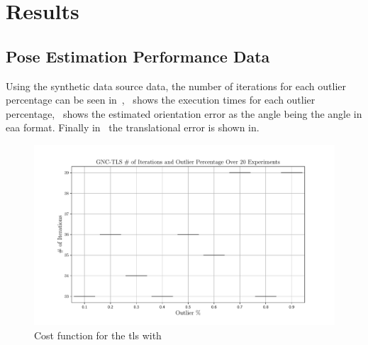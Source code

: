 \section{Results}\label{sec:2-pose-estimation-results}

\subsection{Pose Estimation Performance Data}

Using the synthetic data source data, the number of iterations for each outlier percentage can be seen in~,~ shows the execution times for each outlier percentage,~ shows the estimated orientation error as the angle  being the angle in \gls{eaa} format. Finally in~ the translational error is shown in. \medskip 
\begin{figure}[!h]
	\begin{center}
		\includegraphics[width=\textwidth]{chapters/2-pose-estimation/fig/GNC-TLS-iterations-e.pdf}
	\end{center}
	\caption{Cost function for the \gls{tls} with }
	\label{fig:GNC-TLS-iterations-e}
\end{figure}


